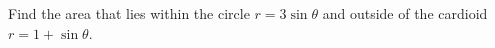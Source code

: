 \begin{frame}
\begin{example}[Example 2, p. 687]
Find the area that lies within the circle $r = 3\sin\theta$ and outside of the cardioid $r = 1+\sin \theta$.
\begin{columns}[c]
\hspace{-.1in}
\ %


\end{columns}
\end{example}
\end{frame}
